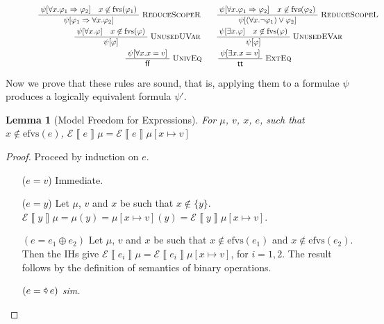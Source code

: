 \documentclass{article}
\newcommand{\denote}[1]{\left\llbracket#1\right\rrbracket}
\newcommand{\edenote}[1]{\mathcal{E}\denote{#1}}
\newcommand{\TRUE}{\mathsf{tt}}
\newcommand{\FALSE}{\mathsf{ff}}
\newcommand{\binop}{\mathbin{\oplus}}
\newcommand{\unop}{\mathop{\text{\pointer}}}
\newcommand{\fvs}{\textrm{fvs}}
\newcommand{\efvs}{\textrm{efvs}}
\newcommand{\andalso}{\quad}
\newcommand{\pad}[1]{\mbox{}\;#1\;\mbox{}}
\newcommand{\infrule}[3]{\ensuremath{\frac{\pad{#1}}{\pad{#2}}\;{\textsc{#3}}}}
\theoremstyle{plain}
\newtheorem{lemma}{Lemma}
\theoremstyle{definition}
\theoremstyle{remark}
\begin{document}
\begin{figure}[H]
  \[
    \begin{array}{>{\displaystyle}c}
      \infrule{
      \psi[\forall x. \varphi_{1} \Rightarrow \varphi_{2}] \andalso x \not \in \fvs(\varphi_{1})}{\psi[\varphi_{1} \Rightarrow \forall x. \varphi_{2}]}{ReduceScopeR} \qquad

      \infrule{\psi[\forall x. \varphi_{1} \Rightarrow \varphi_{2}] \andalso x \not \in \fvs(\varphi_{2})}{\psi[(\forall x. \neg \varphi_{1}) \vee \varphi_{2}]}{ReduceScopeL} \\[1em]

      \infrule{\psi[\forall x. \varphi] \andalso x \not \in \fvs(\varphi)}{\psi[\varphi]}{UnusedUVar}
      \qquad
      \infrule{\psi[\exists x. \varphi] \andalso x \not \in \fvs(\varphi)}{\psi[\varphi]}{UnusedEVar}  \\[1em]

      \infrule{\psi[\forall x. x = v]}{\FALSE}{UnivEq}
      \qquad
      \infrule{\psi[\exists x. x = v]}{\TRUE}{ExtEq}
    \end{array}
  \]
\end{figure}

Now we prove that these rules are sound, that is, applying them to a formulae
$\psi$ produces a logically equivalent formula $\psi'$.

\begin{lemma}[Model Freedom for Expressions]
  \label{lem:model-freedom-expressions}
  For $\mu$, $v$, $x$, $e$, such that $x \not \in \efvs(e)$,
  $\edenote e \mu = \edenote e \mu[x \mapsto v]$
\end{lemma}
\begin{proof}
  Proceed by induction on $e$.
  \begin{enumerate}[align=left]
    \item[($e = v$)] Immediate.
    \item[($e = y$)] Let $\mu$, $v$ and $x$ be such that $x \not \in \{y\}$.
    $\edenote y \mu = \mu(y) = \mu[x \mapsto v](y) = \edenote y \mu[x \mapsto v]$.
    \item[$(e = e_{1} \binop e_{2})$] Let $\mu$, $v$ and $x$ be such that
    $x \not \in \efvs(e_{1})$ and $x \not \in \efvs(e_{2})$.
    Then the IHs give $\edenote{e_{i}}\mu = \edenote{e_{i}}\mu[x \mapsto v]$, for $i=1,2$.
    The result follows by the definition of semantics of binary operations.
    \item[$(e = \unop e)$] \textit{sim.}
  \end{enumerate}
\end{proof}
\end{document}
